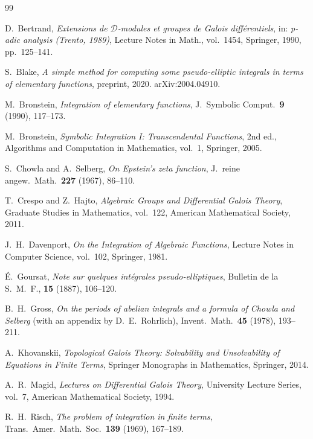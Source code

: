 \documentclass[11pt,a4paper]{article}
\theoremstyle{plain}
\theoremstyle{definition}
\theoremstyle{remark}
\begin{document}
\begin{thebibliography}{99}

D.~Bertrand,
\emph{Extensions de $\mathcal{D}$-modules et groupes de Galois diff\'erentiels},
in: \emph{p-adic analysis (Trento, 1989)}, Lecture Notes in Math., vol.~1454, Springer, 1990, pp.~125--141.

S.~Blake,
\emph{A simple method for computing some pseudo-elliptic integrals in terms of elementary functions},
preprint, 2020. arXiv:2004.04910.

M.~Bronstein,
\emph{Integration of elementary functions},
J.~Symbolic Comput.\ \textbf{9} (1990), 117--173.

M.~Bronstein,
\emph{Symbolic Integration I: Transcendental Functions},
2nd ed., Algorithms and Computation in Mathematics, vol.~1, Springer, 2005.

S.~Chowla and A.~Selberg,
\emph{On Epstein's zeta function},
J.~reine angew.\ Math.\ \textbf{227} (1967), 86--110.

T.~Crespo and Z.~Hajto,
\emph{Algebraic Groups and Differential Galois Theory},
Graduate Studies in Mathematics, vol.~122, American Mathematical Society, 2011.

J.~H.~Davenport,
\emph{On the Integration of Algebraic Functions},
Lecture Notes in Computer Science, vol.~102, Springer, 1981.

\'E.~Goursat,
\emph{Note sur quelques int\'egrales pseudo-elliptiques},
Bulletin de la S.~M.~F., \textbf{15} (1887), 106--120.

B.~H.~Gross,
\emph{On the periods of abelian integrals and a formula of Chowla and Selberg} (with an appendix by D.~E.~Rohrlich),
Invent.\ Math.\ \textbf{45} (1978), 193--211.

A.~Khovanskii,
\emph{Topological Galois Theory: Solvability and Unsolvability of Equations in Finite Terms},
Springer Monographs in Mathematics, Springer, 2014.

A.~R.~Magid,
\emph{Lectures on Differential Galois Theory},
University Lecture Series, vol.~7, American Mathematical Society, 1994.

R.~H.~Risch,
\emph{The problem of integration in finite terms},
Trans.\ Amer.\ Math.\ Soc.\ \textbf{139} (1969), 167--189.


\end{thebibliography}
\end{document}
